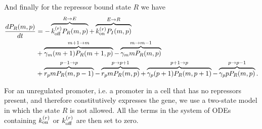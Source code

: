 And finally for the repressor bound state $R$ we have
\begin{equation}
  \begin{aligned}
    \dt{P_R(m, p)} &=
    - \overbrace{\kroff P_R(m, p)}^{R \rightarrow E} %
    + \overbrace{\kron P_I(m, p)}^{E \rightarrow R}\\ %
    &+ \overbrace{\gm (m + 1) P_R(m+1 , p)}^{m+1 \rightarrow m} %
    - \overbrace{\gm m P_R(m , p)}^{m \rightarrow m-1}\\ %
    &+ \overbrace{r_p m P_R(m, p - 1)}^{p-1 \rightarrow p} %
    - \overbrace{r_p m P_R(m, p)}^{p \rightarrow p+1} %
    + \overbrace{\gp (p + 1) P_R(m, p + 1)}^{p + 1 \rightarrow p} %
    - \overbrace{\gp p P_R(m, p)}^{p \rightarrow p-1}. %
  \end{aligned}
\end{equation}

For an unregulated promoter, i.e. a promoter in a cell that has no repressors
present, and therefore constitutively expresses the gene, we use a two-state
model in which the state $R$ is not allowed. All the terms in the system of ODEs
containing $k^{(r)}_{\text{on}}$ or $k^{(r)}_{\text{off}}$ are then set to zero.

